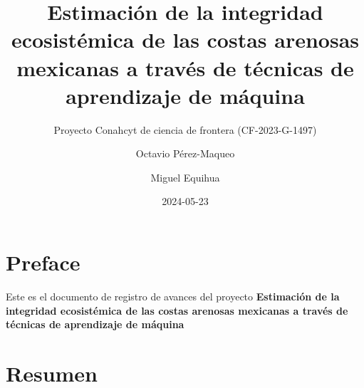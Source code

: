 \documentclass[
  letterpaper,
  DIV=11,
  numbers=noendperiod]{scrreprt}
\title{Estimación de la integridad ecosistémica de las costas arenosas
mexicanas a través de técnicas de aprendizaje de máquina}
\subtitle{Proyecto Conahcyt de ciencia de frontera (CF-2023-G-1497)}
\author{Octavio Pérez-Maqueo \and Miguel Equihua}
\date{2024-05-23}
\renewcommand*\contentsname{Tabla de contenidos}
\newcommand\contentsname{Tabla de contenidos}
\begin{document}
\maketitle
\ifdefined\Shaded\renewenvironment{Shaded}{\begin{tcolorbox}[boxrule=0pt, borderline west={3pt}{0pt}{shadecolor}, frame hidden, sharp corners, interior hidden, enhanced, breakable]}{\end{tcolorbox}}\fi

\renewcommand*\contentsname{Tabla de contenidos}
{
\hypersetup{linkcolor=}
\setcounter{tocdepth}{2}
\tableofcontents
}

\hypertarget{preface}{%
\chapter*{Preface}\label{preface}}


Este es el documento de registro de avances del proyecto
\textbf{Estimación de la integridad ecosistémica de las costas arenosas
mexicanas a través de técnicas de aprendizaje de máquina}


\hypertarget{resumen}{%
\chapter{Resumen}\label{resumen}}
\end{document}
